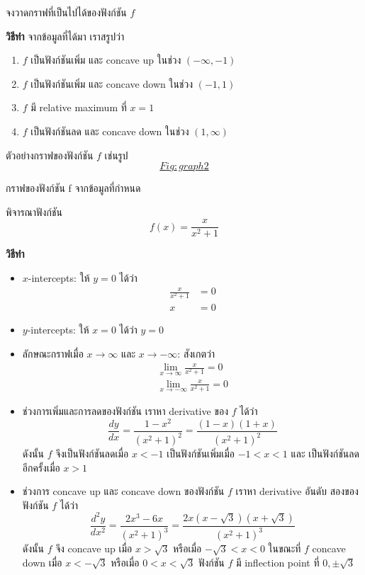 \documentclass[
]{book}
\begin{document}
จงวาดกราฟที่เป็นไปได้ของฟังก์ชัน \(f\)

\textbf{วิธีทำ} จากข้อมูลที่ได้มา เราสรูปว่า

\begin{enumerate}
\def\labelenumi{\arabic{enumi}.}
\item
  \(f\) เป็นฟังก์ชันเพิ่ม และ concave up ในช่วง \((-\infty,-1)\)
\item
  \(f\) เป็นฟังก์ชันเพิ่ม และ concave down ในช่วง \((-1,1)\)
\item
  \(f\) มี relative maximum ที่ \(x=1\)
\item
  \(f\) เป็นฟังก์ชันลด และ concave down ในช่วง \((1,\infty)\)
\end{enumerate}

ตัวอย่างกราฟของฟังก์ชัน \(f\) เช่นรูป~\hyperref[Fig:graph2]{\[Fig:graph2\]}

กราฟของฟังก์ชัน {f} จากข้อมูลที่กำหนด

พิจารณาฟังก์ชัน \[f(x) = \frac{x}{x^2+1}\]

\textbf{วิธีทำ}

\begin{itemize}
\item
  \(x\)-intercepts: ให้ \(y=0\) ได้ว่า \begin{equation}   \begin{aligned}
      \frac{x}{x^2+1} &= 0 \\
      x &= 0
    \end{aligned} \end{equation}
\item
  \(y\)-intercepts: ให้ \(x=0\) ได้ว่า \(y=0\)
\item
  ลักษณะกราฟเมื่อ \(x \to \infty\) และ \(x \to -\infty\): สังเกตว่า
  \begin{equation}   \begin{aligned}
      \lim_{x\to \infty} \frac{x}{x^2+1} = 0 \\
      \lim_{x\to -\infty} \frac{x}{x^2+1} = 0
    \end{aligned} \end{equation}
\item
  ช่วงการเพิ่มและการลดของฟังก์ชัน เราหา derivative ของ \(f\) ได้ว่า
  \[\frac{dy}{dx} = \frac{1-x^2}{(x^2+1)^2}  =\frac{(1-x)(1+x)}{(x^2+1)^2}\]
  ดังนั้น \(f\) จึงเป็นฟังก์ชันลดเมื่อ \(x < -1\) เป็นฟังก์ชันเพิ่มเมื่อ \(-1 < x < 1\)
  และ เป็นฟังก์ชันลดอีกครั้งเมื่อ \(x>1\)
\item
  ช่วงการ concave up และ concave down ของฟังก์ชัน \(f\) เราหา derivative
  อันดับ สองของฟังก์ชัน \(f\) ได้ว่า
  \[\frac{d^2y}{dx^2} = \frac{2x^3-6x}{(x^2+1)^3} = \frac{2x(x-\sqrt{3})(x+\sqrt{3})}{(x^2+1)^3}\]
  ดังนั้น \(f\) จึง concave up เมื่อ \(x>\sqrt{3}\) หรือเมื่อ \(-\sqrt{3}<x<0\)
  ในขณะที่ \(f\) concave down เมื่อ \(x<-\sqrt{3}\) หรือเมื่อ \(0<x<\sqrt{3}\)
  ฟังก์ชัน \(f\) มี inflection point ที่ \(0,\pm\sqrt{3}\)
\end{itemize}
\end{document}
